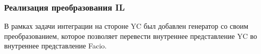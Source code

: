 \documentclass[14pt]{matmex-diploma}
\begin{document}

\subsubsection{Реализация преобразования IL}
В рамках задачи интеграции на стороне YC был добавлен генератор со своим преобразованием, которое позволяет перевести внутреннее представление YC во внутреннее представление Facio.
\end{document}
